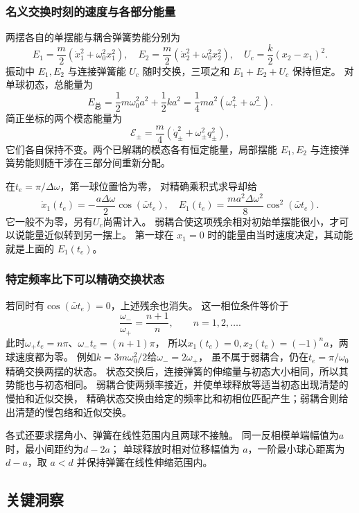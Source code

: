 \documentclass[UTF8,fontset=fandol,a4paper,11pt]{ctexart}
\begin{document}
\subsubsection*{名义交换时刻的速度与各部分能量}
两摆各自的单摆能与耦合弹簧势能分别为
\[
E_1=\frac m2(\dot x_1^2+\omega_0^2x_1^2),\quad
E_2=\frac m2(\dot x_2^2+\omega_0^2x_2^2),\quad
U_c=\frac k2(x_2-x_1)^2.
\]
振动中 $E_1,E_2$ 与连接弹簧能 $U_c$ 随时交换，三项之和 $E_1+E_2+U_c$ 保持恒定。
对单球初态，总能量为
\[
E_{\text{总}}=\frac12m\omega_0^2a^2+\frac12ka^2
=\frac14ma^2(\omega_+^2+\omega_-^2).
\]
简正坐标的两个模态能量为
\[
\mathcal E_\pm=\frac m4(\dot q_\pm^2+\omega_\pm^2q_\pm^2),
\]
它们各自保持不变。两个已解耦的模态各有恒定能量，局部摆能 $E_1,E_2$ 与连接弹簧势能则随干涉在三部分间重新分配。

在$t_e=\pi/\Delta\omega$，第一球位置恰为零，
对精确乘积式求导却给
\[
\dot x_1(t_e)=-\frac{a\Delta\omega}{2}\cos(\bar\omega t_e),
\quad E_1(t_e)=\frac{ma^2\Delta\omega^2}{8}\cos^2(\bar\omega t_e).
\]
它一般不为零，另有$U_c$尚需计入。
弱耦合使这项残余相对初始单摆能很小，才可以说能量近似转到另一摆上。
第一球在 $x_1=0$ 时的能量由当时速度决定，其动能就是上面的 $E_1(t_e)$。

\subsubsection*{特定频率比下可以精确交换状态}
若同时有$\cos(\bar\omega t_e)=0$，上述残余也消失。
这一相位条件等价于
\[
\frac{\omega_-}{\omega_+}=\frac{n+1}{n},\qquad n=1,2,\ldots.
\]
此时$\omega_+t_e=n\pi$、$\omega_-t_e=(n+1)\pi$，
所以$x_1(t_e)=0,x_2(t_e)=(-1)^n a$，两球速度都为零。
例如$k=3m\omega_0^2/2$给$\omega_-=2\omega_+$，
虽不属于弱耦合，仍在$t_e=\pi/\omega_0$精确交换两摆的状态。
状态交换后，连接弹簧的伸缩量与初态大小相同，所以其势能也与初态相同。
弱耦合使两频率接近，并使单球释放等适当初态出现清楚的慢拍和近似交换，
精确状态交换由给定的频率比和初相位匹配产生；弱耦合则给出清楚的慢包络和近似交换。

各式还要求摆角小、弹簧在线性范围内且两球不接触。
同一反相模单端幅值为$a$时，最小间距约为$d-2a$；
单球释放时相对位移幅值为 $a$，一阶最小球心距离为 $d-a$，取 $a<d$ 并保持弹簧在线性伸缩范围内。




\subsection*{关键洞察}
\end{document}
